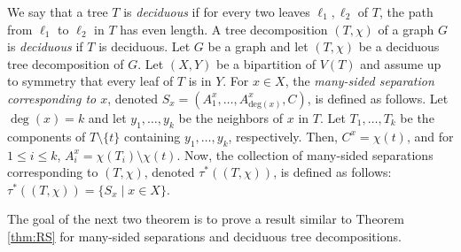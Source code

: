 \documentclass[12pt]{amsart}
\begin{document}
We say that a tree $T$ is {\em deciduous} if for every two leaves $\ell_1, \ell_2$ of $T$, the path from $\ell_1$ to $\ell_2$ in $T$ has even length. A tree decomposition $(T, \chi)$ of a graph $G$ is {\em deciduous} if $T$ is deciduous. Let $G$ be a graph and let $(T, \chi)$ be a deciduous tree decomposition of $G$. Let $(X, Y)$ be a bipartition of $V(T)$ and assume up to symmetry that every leaf of $T$ is in $Y$. For $x \in X$, the {\em many-sided separation corresponding to $x$}, denoted $S_x = (A_1^x, \hdots, A_{\text{deg}(x)}^x, C)$, is defined as follows. Let $\deg(x) = k$ and let $y_1, \hdots, y_k$ be the neighbors of $x$ in $T$. Let $T_1, \hdots, T_k$ be the components of $T \setminus \{t\}$ containing $y_1, \hdots, y_k$, respectively. Then, $C^x = \chi(t)$, and for $1 \leq i \leq k$, $A_i^x = \chi(T_i) \setminus \chi(t)$. Now, the collection of many-sided separations corresponding to $(T, \chi)$, denoted $\tau^*((T, \chi))$, is defined as follows: $\tau^*((T, \chi)) = \{S_x \mid x \in X\}$.

The goal of the next two theorem is to prove a result similar to Theorem \ref{thm:RS} for many-sided separations and deciduous tree decompositions.

\end{document}
